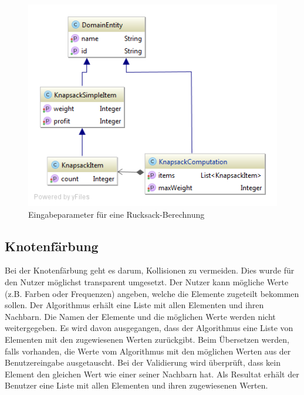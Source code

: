 \begin{figure}[h]
\centering
\includegraphics[scale=0.5]{images/probleme/knapsack.png}
\caption[Eingabeparameter für eine Rucksack-Berechnung]{Eingabeparameter für eine Rucksack-Berechnung \selfmade{}}
\label{fig:knapsack_input}
\end{figure}

\FloatBarrier

%
%
%
%

\subsection{Knotenfärbung}
Bei der Knotenfärbung geht es darum, Kollisionen zu vermeiden. Dies wurde für den Nutzer möglichst transparent umgesetzt. Der Nutzer kann mögliche Werte (z.B. Farben oder 
Frequenzen) angeben, welche die Elemente zugeteilt bekommen sollen. Der Algorithmus erhält eine Liste mit allen Elementen und ihren Nachbarn. Die Namen der Elemente und die möglichen 
Werte werden nicht weitergegeben. Es wird davon ausgegangen, dass der Algorithmus eine Liste von Elementen mit den zugewiesenen Werten zurückgibt. Beim Übersetzen werden, falls 
vorhanden, die Werte vom Algorithmus mit den möglichen Werten aus der Benutzereingabe ausgetauscht. Bei der Validierung wird überprüft, dass kein Element den gleichen Wert wie einer 
seiner Nachbarn hat. Als Resultat erhält der Benutzer eine Liste mit allen Elementen und ihren zugewiesenen Werten.


